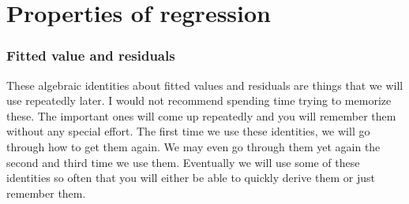 \part{Properties of regression}

\frame{\partpage}

\section{Fitted value and residuals}

These algebraic identities about fitted values and residuals are
things that we will use repeatedly later. I would not recommend
spending time trying to memorize these. The important ones will come
up repeatedly and you will remember them without any special
effort. The first time we use these identities, we will go through how
to get them again. We may even go through them yet again the second
and third time we use them. Eventually we will use some of these
identities so often that you will either be able to quickly derive
them or just remember them.


